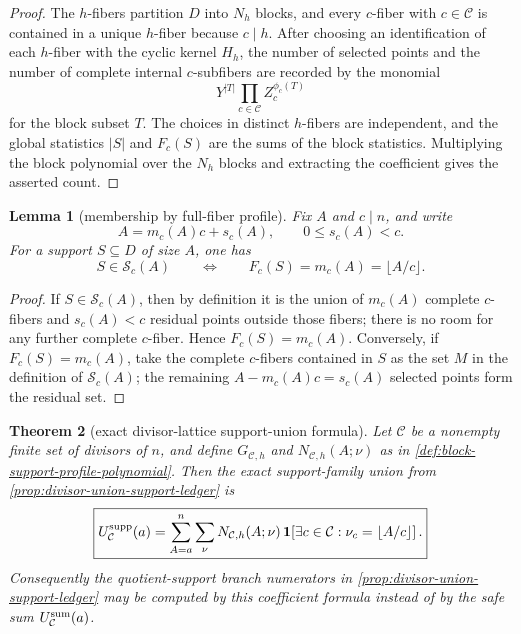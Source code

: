 \documentclass[11pt]{article}
\newtheorem{theorem}{Theorem}[section]
\newtheorem{lemma}[theorem]{Lemma}
\theoremstyle{definition}
\theoremstyle{remark}
\begin{document}
\begin{proof}
The $h$-fibers partition $D$ into $N_h$ blocks, and every $c$-fiber with
$c\in\mathcal C$ is contained in a unique $h$-fiber because $c\mid h$.  After
choosing an identification of each $h$-fiber with the cyclic kernel $H_h$, the
number of selected points and the number of complete internal $c$-subfibers are
recorded by the monomial
\[
        Y^{|T|}\prod_{c\in\mathcal C}Z_c^{\phi_c(T)}
\]
for the block subset $T$.  The choices in distinct $h$-fibers are independent,
and the global statistics $|S|$ and $F_c(S)$ are the sums of the block statistics.
Multiplying the block polynomial over the $N_h$ blocks and extracting the
coefficient gives the asserted count.
\end{proof}

\begin{lemma}[membership by full-fiber profile]
\label{lem:quotient-support-membership-profile}
Fix $A$ and $c\mid n$, and write
\[
        A=m_c(A)c+s_c(A),
        \qquad 0\le s_c(A)<c .
\]
For a support $S\subseteq D$ of size $A$, one has
\[
        S\in\mathcal S_c(A)
        \qquad\Longleftrightarrow\qquad
        F_c(S)=m_c(A)=\lfloor A/c\rfloor .
\]
\end{lemma}

\begin{proof}
If $S\in\mathcal S_c(A)$, then by definition it is the union of
$m_c(A)$ complete $c$-fibers and $s_c(A)<c$ residual points outside those fibers;
there is no room for any further complete $c$-fiber.  Hence
$F_c(S)=m_c(A)$.  Conversely, if $F_c(S)=m_c(A)$, take the complete $c$-fibers
contained in $S$ as the set $M$ in the definition of $\mathcal S_c(A)$; the
remaining $A-m_c(A)c=s_c(A)$ selected points form the residual set.
\end{proof}

\begin{theorem}[exact divisor-lattice support-union formula]
\label{thm:exact-divisor-block-support-ledger}
Let $\mathcal C$ be a nonempty finite set of divisors of $n$, and define
$G_{\mathcal C,h}$ and $N_{\mathcal C,h}(A;\nu)$ as in
\cref{def:block-support-profile-polynomial}.  Then the exact support-family
union from \cref{prop:divisor-union-support-ledger} is
\[
\boxed{
        U_{\mathcal C}^{\rm supp}(a)
        =\sum_{A=a}^{n}\sum_{\nu}
          N_{\mathcal C,h}(A;\nu)\,
          \mathbf 1\!
          \left[\exists c\in\mathcal C:
                 \nu_c=\left\lfloor A/c\right\rfloor\right].
      }
\]
Consequently the quotient-support branch numerators in
\cref{prop:divisor-union-support-ledger} may be computed by this coefficient
formula instead of by the safe sum
$U_{\mathcal C}^{\rm sum}(a)$.
\end{theorem}
\end{document}
